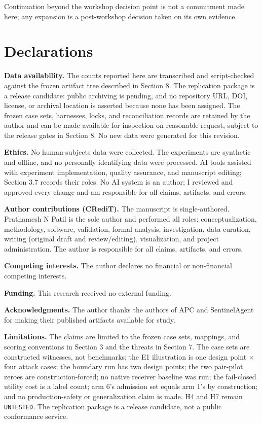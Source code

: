 \documentclass[
  10pt,
]{article}
\newcounter{none} %
\let\origtexttt\texttt
\renewcommand{\texttt}[1]{{\upshape\origtexttt{#1}}}
\renewcommand{\_}{\allowbreak\origunderscore}
\begin{document}
Continuation beyond the workshop decision point is not a commitment made
here; any expansion is a post-workshop decision taken on its own
evidence.

\section{Declarations}\label{declarations}

\textbf{Data availability.} The counts reported here are transcribed and
script-checked against the frozen artifact tree described in Section 8.
The replication package is a release candidate: public archiving is
pending, and no repository URL, DOI, license, or archival location is
asserted because none has been assigned. The frozen case sets,
harnesses, locks, and reconciliation records are retained by the author
and can be made available for inspection on reasonable request, subject
to the release gates in Section 8. No new data were generated for this
revision.

\textbf{Ethics.} No human-subjects data were collected. The experiments
are synthetic and offline, and no personally identifying data were
processed. AI tools assisted with experiment implementation, quality
assurance, and manuscript editing; Section 3.7 records their roles. No
AI system is an author; I reviewed and approved every change and am
responsible for all claims, artifacts, and errors.

\textbf{Author contributions (CRediT).} The manuscript is
single-authored. Prathamesh N Patil is the sole author and performed all
roles: conceptualization, methodology, software, validation, formal
analysis, investigation, data curation, writing (original draft and
review/editing), visualization, and project administration. The author
is responsible for all claims, artifacts, and errors.

\textbf{Competing interests.} The author declares no financial or
non-financial competing interests.

\textbf{Funding.} This research received no external funding.

\textbf{Acknowledgments.} The author thanks the authors of APC and
SentinelAgent for making their published artifacts available for study.

\textbf{Limitations.} The claims are limited to the frozen case sets,
mappings, and scoring conventions in Section 3 and the threats in
Section 7. The case sets are constructed witnesses, not benchmarks; the
E1 illustration is one design point × four attack cases; the boundary
run has two design points; the two pair-pilot zeroes are
construction-forced; no native receiver baseline was run; the
fail-closed utility cost is a label count; arm 6's admission set equals
arm 1's by construction; and no production-safety or generalization
claim is made. H4 and H7 remain \texttt{UNTESTED}. The replication
package is a release candidate, not a public conformance service.
\end{document}
